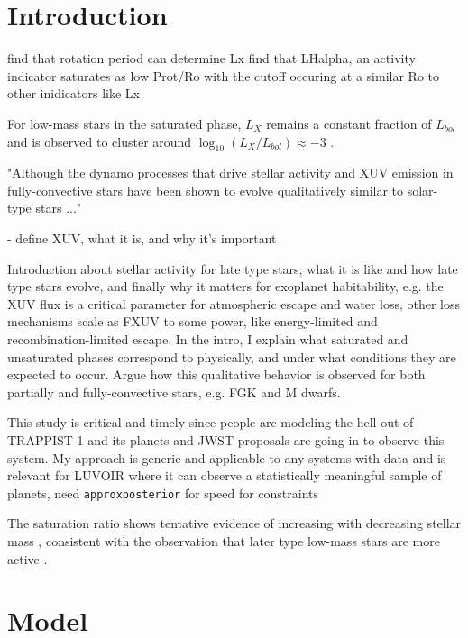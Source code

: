 \documentclass[twocolumn]{aastex62}
\newcommand{\approxposterior}[0]{\texttt{approxposterior}\xspace}
\begin{document}

\section{Introduction} \label{sec:intro}

\citet{Reiners2014} find that rotation period can determine Lx
\citet{Newton2017} find that LHalpha, an activity indicator saturates as low Prot/Ro with the cutoff occuring at a similar Ro to other inidicators like Lx

For low-mass stars in the saturated phase, $L_{X}$ remains a constant fraction of $L_{bol}$ and is observed to cluster around $\log_{10}(L_X/L_{bol}) \approx -3$ \citep{Pizzolato2003,Wright2011,Wright2018}. 

"Although the dynamo processes that drive stellar activity and XUV emission in fully-convective stars have been shown to evolve qualitatively similar to solar-type stars \citep{Wright2016,Wright2018} ..."

- define XUV, what it is, and why it's important

Introduction about stellar activity for late type stars, what it is like and how late type stars evolve, and finally why it matters for exoplanet habitability, e.g. the XUV flux is a critical parameter for atmospheric escape and water loss, other loss mechanisms scale as FXUV to some power, like energy-limited and recombination-limited escape. In the intro, I explain what saturated and unsaturated phases correspond to physically, and under what conditions they are expected to occur. Argue how this qualitative behavior is observed for both partially and fully-convective stars, e.g. FGK and M dwarfs.

This study is critical and timely since people are modeling the hell out of TRAPPIST-1 and its planets and JWST proposals are going in to observe this system. My approach is generic and applicable to any systems with data and is relevant for LUVOIR where it can observe a statistically meaningful sample of planets, need \approxposterior for speed for constraints

The saturation ratio shows tentative evidence of increasing with decreasing stellar mass \citep{Wright2011,Jackson2012}, consistent with the observation that later type low-mass stars are more active \citep[e.g.][]{West2008}. 

\section{Model} \label{sec:model}
\end{document}
